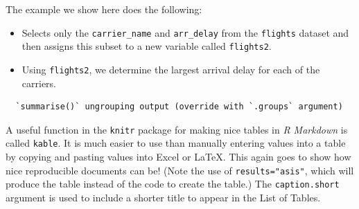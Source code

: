 \documentclass[12pt,phd,a4paper,twoside]{ucl_thesis}
\begin{document}
  The example we show here does the following:
  \begin{itemize}
  \item
    Selects only the \texttt{carrier\_name} and \texttt{arr\_delay} from the \texttt{flights} dataset and then assigns this subset to a new variable called \texttt{flights2}.
  \item
    Using \texttt{flights2}, we determine the largest arrival delay for each of the carriers.
  \end{itemize}
  \begin{Shaded}
  \end{Shaded}
  \begin{verbatim}
  `summarise()` ungrouping output (override with `.groups` argument)
  \end{verbatim}
  A useful function in the \texttt{knitr} package for making nice tables in \emph{R Markdown} is called \texttt{kable}. It is much easier to use than manually entering values into a table by copying and pasting values into Excel or LaTeX. This again goes to show how nice reproducible documents can be! (Note the use of \texttt{results="asis"}, which will produce the table instead of the code to create the table.) The \texttt{caption.short} argument is used to include a shorter title to appear in the List of Tables.
  \begin{Shaded}
  \begin{Highlighting}[]
         \NormalTok{(}\NormalTok{, }\NormalTok{),}
         \NormalTok{,}
         \NormalTok{,}
         \NormalTok{,}
         \NormalTok{)}
  \end{Highlighting}
  \end{Shaded}
\end{document}
